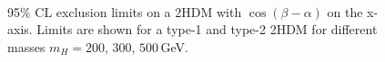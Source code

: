 \begin{figure}[htb]
{}
\\
\caption{95$\%$ CL exclusion limits on a 2HDM with $\cos(\beta-\alpha)$ on the x-axis. Limits are shown for a type-1 and type-2 2HDM for different masses $m_{H}=200$, $300$, $500\,$GeV.}
    \label{fig:2HDM1}
\end{figure}

